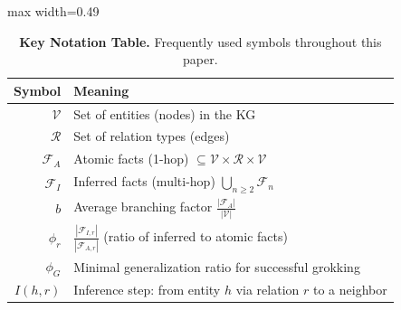             \begin{table}[t]
            \centering
            \caption{\textbf{Key Notation Table.} Frequently used symbols throughout this paper.}
            \vskip 0.1in
            \label{tab:key_notation}
            \begin{adjustbox}{max width=0.49\textwidth}
                \begin{tabular}{r l}
                    \toprule
                    \textbf{Symbol} & \textbf{Meaning} \\
                    \midrule
                    \(\mathcal{V}\) & Set of entities (nodes) in the KG \\
                    \(\mathcal{R}\) & Set of relation types (edges) \\
                    \(\mathcal{F}_A\) & Atomic facts (1-hop) \(\subseteq \mathcal{V}\times\mathcal{R}\times\mathcal{V}\)\\
                    \(\mathcal{F}_I\) & Inferred facts (multi-hop) \(\bigcup_{n\ge2}\mathcal{F}_n\)\\
                    \(b\) & Average branching factor \(\tfrac{|\mathcal{F}_A|}{|\mathcal{V}|}\) \\
                    \(\phi_r\) & \(\tfrac{|\mathcal{F}_{I,r}|}{|\mathcal{F}_{A,r}|}\) (ratio of inferred to atomic facts)\\
                    \(\phi_G\) & Minimal generalization ratio for successful grokking \\
                    \(I(h,r)\) & Inference step: from entity \(h\) via relation \(r\) to a neighbor \\
                    \bottomrule
                \end{tabular}
            \end{adjustbox}
            \end{table}
        
